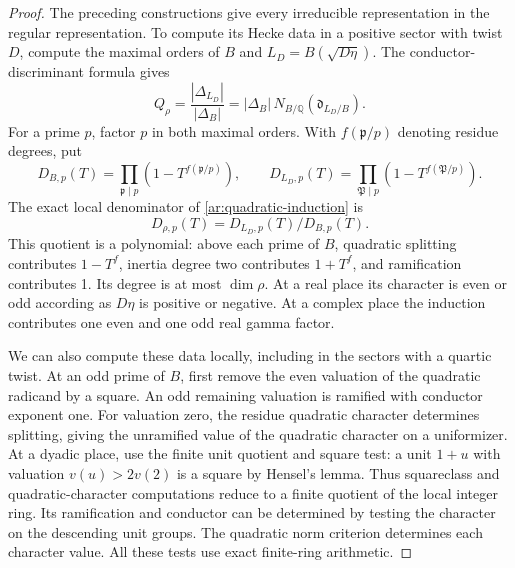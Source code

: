 \begin{proof}
The preceding constructions give every irreducible representation in
the regular representation. To compute its Hecke data in a positive
sector with twist $D$, compute the maximal orders of
$B$ and $L_D=B(\sqrt{D\eta})$. The conductor-discriminant formula gives
\begin{equation}\label{ar:conductor-ratio}
 Q_\rho=\frac{|\Delta_{L_D}|}{|\Delta_B|}
       =|\Delta_B|\,N_{B/\mathbb Q}(\mathfrak d_{L_D/B}).
\end{equation}
For a prime $p$, factor $p$ in both maximal orders. With
$f(\mathfrak p/p)$ denoting residue degrees, put
\[
 D_{B,p}(T)=\prod_{\mathfrak p\mid p}(1-T^{f(\mathfrak p/p)}),
 \qquad
 D_{L_D,p}(T)=\prod_{\mathfrak P\mid p}(1-T^{f(\mathfrak P/p)}).
\]
The exact local denominator of \eqref{ar:quadratic-induction} is
\begin{equation}\label{ar:denominator-ratio}
 D_{\rho,p}(T)=D_{L_D,p}(T)/D_{B,p}(T).
\end{equation}
This quotient is a polynomial: above each prime of $B$, quadratic
splitting contributes $1-T^f$, inertia degree two contributes $1+T^f$,
and ramification contributes 1. Its degree is at most $\dim\rho$.
At a real place its character is even or odd according as $D\eta$
is positive or negative. At a complex place the induction contributes
one even and one odd real gamma factor.

We can also compute these data locally, including in the sectors with a
quartic twist. At an odd prime of $B$, first remove the
even valuation of the quadratic radicand by a square. An odd remaining
valuation is ramified with conductor exponent one. For valuation zero,
the residue quadratic character determines splitting, giving the
unramified value of the quadratic character on a uniformizer. At a
dyadic place, use the finite unit quotient and square test: a unit
$1+u$ with valuation $v(u)>2v(2)$ is a square by Hensel's lemma. Thus
squareclass and quadratic-character computations reduce to a finite
quotient of the local integer ring. Its ramification and conductor can
be determined by testing the character on the descending unit groups.
The quadratic norm criterion determines each character value. All these tests
use exact finite-ring arithmetic.


\end{proof}
